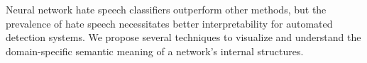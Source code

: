 Neural network hate speech classifiers outperform other methods, but the prevalence of hate speech necessitates better interpretability for automated detection systems. We propose several techniques to visualize and understand the domain-specific semantic meaning of a network's internal structures.
